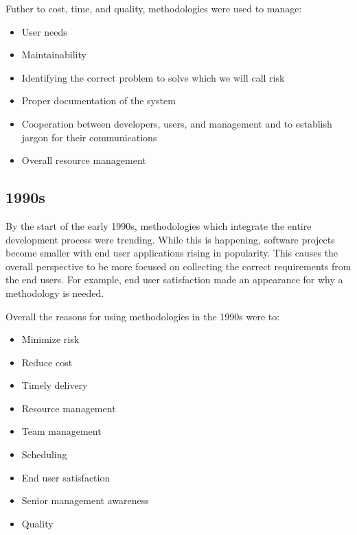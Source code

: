 Futher to cost, time, and quality, methodologies were used to manage:
\begin{itemize}
    \item User needs \cite{peacham_1985}
    \item Maintainability \cite{peacham_1985}
    \item Identifying the correct problem to solve which we will call risk \cite{peacham_1985}
    \item Proper documentation of the system \cite{loesh_1985}
    \item Cooperation between developers, users, and management and to establish jargon for their communications \cite{loesh_1985}
    \item Overall resource management \cite{mannino_1987}
\end{itemize}

\subsection{1990s}
By the start of the early 1990s, methodologies which integrate the entire development process were trending.
While this is happening, software projects become smaller with end user applications rising in popularity.
This causes the overall perspective to be more focused on collecting the correct requirements \cite{paul_1993} from the end users.
For example, end user satisfaction made an appearance for why a methodology is needed.
\cite{drake_1991}

Overall the reasons for using methodologies in the 1990s were to:
\begin{itemize}
    \item Minimize risk \cite{drake_1991, trussel_1999}
    \item Reduce cost \cite{drake_1991, scarre_1992, paul_1993}
    \item Timely delivery \cite{drake_1991, scarre_1992, herald_1993, trussel_1999}
    \item Resource management \cite{drake_1991}
    \item Team management \cite{drake_1991}
    \item Scheduling \cite{drake_1991, paul_1993}
    \item End user satisfaction \cite{drake_1991}
    \item Senior management awareness \cite{drake_1991}
    \item Quality \cite{drake_1991, scarre_1992, herald_1993, trussel_1999}
\end{itemize}

